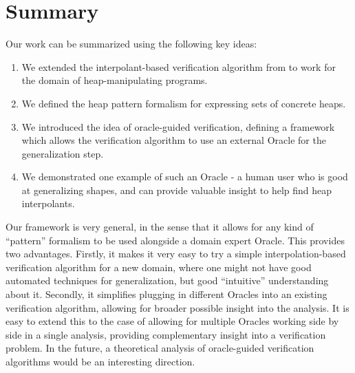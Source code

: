 \section{Summary}
Our work can be summarized using the following key ideas:

\begin{enumerate}
  \item We extended the interpolant-based verification algorithm from \cite{mcmillan06} to work for the domain of heap-manipulating programs.
  \item We defined the heap pattern formalism for expressing sets of concrete heaps.
  \item We introduced the idea of oracle-guided verification, defining a framework which allows the verification algorithm to use an external Oracle for the generalization step.
  \item We demonstrated one example of such an Oracle - a human user who is good at generalizing shapes, and can provide valuable insight to help find heap interpolants.
\end{enumerate}

Our framework is very general, in the sense that it allows for any kind of ``pattern''
formalism to be used alongside a domain expert Oracle. This provides two advantages.
Firstly, it makes it very easy to try a simple interpolation-based verification
algorithm for a new domain, where one might not have good automated techniques for
generalization, but good ``intuitive'' understanding about it. Secondly, it simplifies
plugging in different Oracles into an existing verification algorithm, allowing for
broader possible insight into the analysis. It is easy to extend this to the case of
allowing for multiple Oracles working side by side in a single analysis, providing
complementary insight into a verification problem. In the future, a theoretical analysis
of oracle-guided verification algorithms would be an interesting direction.
